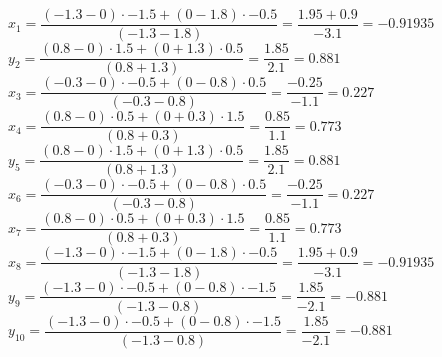 \documentclass[a4paper]{article}
\begin{document}
\begin{enumerate}
			$ x_{1} = \dfrac{(-1.3 - 0) \cdot -1.5 + (0 - 1.8) \cdot -0.5}{(-1.3 - 1.8)} = \dfrac{1.95 + 0.9}{-3.1} = -0.91935$\\ 
			
			$y_{2} = \dfrac{(0.8 - 0) \cdot 1.5 + (0 + 1.3) \cdot 0.5}{(0.8 + 1.3)} = \dfrac{1.85}{2.1} = 0.881$\\
			
			$x_{3} = \dfrac{(-0.3 - 0) \cdot -0.5 + (0 - 0.8) \cdot 0.5}{(-0.3 - 0.8)} = \dfrac{-0.25}{-1.1} = 0.227$\\
			
			$x_{4} = \dfrac{(0.8 - 0) \cdot 0.5 + (0 + 0.3) \cdot 1.5}{(0.8 + 0.3)} = \dfrac{0.85}{1.1} =  0.773 $\\ 
			
			$y_{5} = \dfrac{(0.8 - 0) \cdot 1.5 + (0 + 1.3) \cdot 0.5}{(0.8 + 1.3)} = \dfrac{1.85}{2.1} = 0.881$\\
			
			$x_{6} = \dfrac{(-0.3 - 0) \cdot -0.5 + (0 - 0.8) \cdot 0.5}{(-0.3 - 0.8)} = \dfrac{-0.25}{-1.1} = 0.227$\\
			
			$x_{7} = \dfrac{(0.8 - 0) \cdot 0.5 + (0 + 0.3) \cdot 1.5}{(0.8 + 0.3)} = \dfrac{0.85}{1.1} =  0.773 $\\ 
			
			$ x_{8} = \dfrac{(-1.3 - 0) \cdot -1.5 + (0 - 1.8) \cdot -0.5}{(-1.3 - 1.8)} = \dfrac{1.95 + 0.9}{-3.1} = -0.91935$\\ 
			
			$y_{9} = \dfrac{(-1.3 - 0) \cdot -0.5 + (0 - 0.8) \cdot -1.5}{(- 1.3 - 0.8)} = \dfrac{1.85}{- 2.1} = - 0.881$\\


			$y_{10} = \dfrac{(-1.3 - 0) \cdot -0.5 + (0 - 0.8) \cdot -1.5}{(- 1.3 - 0.8)} = \dfrac{1.85}{- 2.1} = - 0.881$\\	
			

\end{enumerate}
\end{document}
